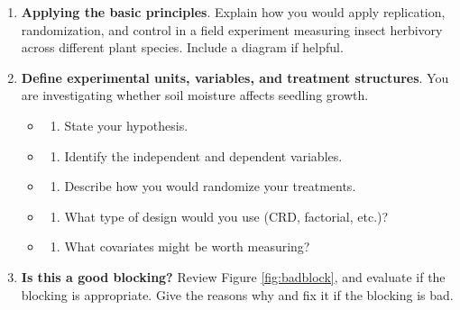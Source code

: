 \documentclass[
]{book}
\providecommand{\tightlist}{%
  \setlength{\itemsep}{0pt}\setlength{\parskip}{0pt}}
\begin{document}
\begin{enumerate}
\def\labelenumi{\arabic{enumi}.}
\setcounter{enumi}{3}
\item
  \textbf{Applying the basic principles}. Explain how you would apply replication, randomization, and control in a field experiment measuring insect herbivory across different plant species. Include a diagram if helpful.
\item
  \textbf{Define experimental units, variables, and treatment structures}. You are investigating whether soil moisture affects seedling growth.

  \begin{itemize}
  \tightlist
  \item
    \begin{enumerate}
    \def\labelenumii{\alph{enumii})}
    \tightlist
    \item
      State your hypothesis.
    \end{enumerate}
  \item
    \begin{enumerate}
    \def\labelenumii{\alph{enumii})}
    \setcounter{enumii}{1}
    \tightlist
    \item
      Identify the independent and dependent variables.
    \end{enumerate}
  \item
    \begin{enumerate}
    \def\labelenumii{\alph{enumii})}
    \setcounter{enumii}{2}
    \tightlist
    \item
      Describe how you would randomize your treatments.
    \end{enumerate}
  \item
    \begin{enumerate}
    \def\labelenumii{\alph{enumii})}
    \setcounter{enumii}{3}
    \tightlist
    \item
      What type of design would you use (CRD, factorial, etc.)?
    \end{enumerate}
  \item
    \begin{enumerate}
    \def\labelenumii{\alph{enumii})}
    \setcounter{enumii}{4}
    \tightlist
    \item
      What covariates might be worth measuring?
    \end{enumerate}
  \end{itemize}
\item
  \textbf{Is this a good blocking?} Review Figure \ref{fig:badblock}, and evaluate if the blocking is appropriate. Give the reasons why and fix it if the blocking is bad.
\end{enumerate}
\end{document}
